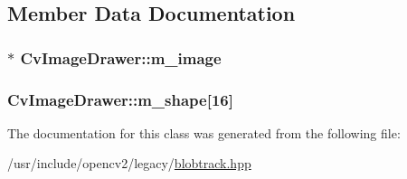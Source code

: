 \subsection{Member Data Documentation}
\hypertarget{classCvImageDrawer_abc9507f66acbc94154890d2f8860b55c}{
\subsubsection[{m\-\_\-image}]{$\ast$ Cv\-Image\-Drawer\-::m\-\_\-image\hspace{0.3cm}{\ttfamily [protected]}}}\label{classCvImageDrawer_abc9507f66acbc94154890d2f8860b55c}
\hypertarget{classCvImageDrawer_a511884ba010be4d50d09522a1f49b3d5}{
\subsubsection[{m\-\_\-shape}]{ Cv\-Image\-Drawer\-::m\-\_\-shape\mbox{[}16\mbox{]}\hspace{0.3cm}{\ttfamily [protected]}}}\label{classCvImageDrawer_a511884ba010be4d50d09522a1f49b3d5}


The documentation for this class was generated from the following file\-:\begin{DoxyCompactItemize}
\item 
/usr/include/opencv2/legacy/\hyperlink{blobtrack_8hpp}{blobtrack.\-hpp}\end{DoxyCompactItemize}
